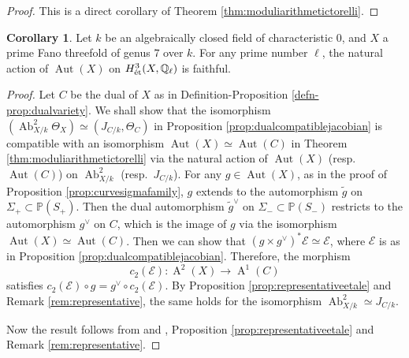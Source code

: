 \documentclass[autodetect-engine, a4paper]{amsart}
\theoremstyle{definition}
\newtheorem{cor}[thm]{Corollary}
\def\P{{\mathbb P}}
\def\Q{{\mathbb Q}}
\DeclareMathOperator\A{\mathrm{A}}
\DeclareMathOperator\Ab{\mathrm{Ab}}
\DeclareMathOperator\Aut{\mathrm{Aut}}
\def\et{\mathop{\text{\rm \'et}}}
\begin{document}
\begin{proof}
This is a direct corollary of Theorem \ref{thm:moduliarithmetictorelli}.
\end{proof}

\begin{cor}
\label{cor:autfaithfulaction}
Let $k$ be an algebraically closed field of characteristic $0$, and $X$ a prime Fano threefold of genus $7$ over $k$.
For any prime number $\ell$, the natural action of $\Aut (X)$ on $H^3_{\et} (X, \Q_{\ell})$ is faithful.
\end{cor}

\begin{proof}
Let $C$ be the dual of $X$ as in Definition-Proposition \ref{defn-prop:dualvariety}.
We shall show that the isomorphism
$(\Ab^2_{X/k} \Theta_{X}) \simeq (J_{C/k}, \Theta_{C})$  
in Proposition \ref{prop:dualcompatiblejacobian} is compatible with an isomorphism $\Aut (X) \simeq \Aut (C)$  in Theorem \ref{thm:moduliarithmetictorelli} via the natural action of $\Aut (X)$ (resp.\ $\Aut (C)$) on $\Ab^2_{X/k}$ (resp.\ $J_{C/k}$).
For any $g \in \Aut (X)$, as in the proof of Proposition \ref{prop:curvesigmafamily}, $g$ extends to the automorphism $\widetilde{g}$ on $\Sigma_{+} \subset \P (S_{+})$.
Then the dual automorphism $\widetilde{g}^{\vee}$ on $\Sigma_{-} \subset \P (S_{-})$ restricts to the automorphism $g^{\vee}$ on $C$, which is the image of $g$ via the isomorphism $\Aut (X) \simeq \Aut (C)$.
Then we can show that $(g \times g^{\vee})^{\ast} \mathcal{E} \simeq \mathcal{E}$, where $\mathcal{E}$ is as in Proposition \ref{prop:dualcompatiblejacobian}.
Therefore, the morphism
\[
c_{2} (\mathcal{E}) \colon \A^2 (X) \rightarrow \A^1 (C)
\]
satisfies $c_{2} (\mathcal{E}) \circ g = g^{\vee} \circ c_{2} (\mathcal{E})$.
By Proposition \ref{prop:representativeetale} and Remark \ref{rem:representative}, the same holds for the isomorphism $\Ab^2_{X/k} \simeq J_{C/k}$.

Now the result follows from \cite[Theorem 1.13]{Deligne-Mumford} and \cite[Section 19, Theorem 3]{Mumford}, Proposition \ref{prop:representativeetale} and Remark \ref{rem:representative}.
\end{proof}
\end{document}
